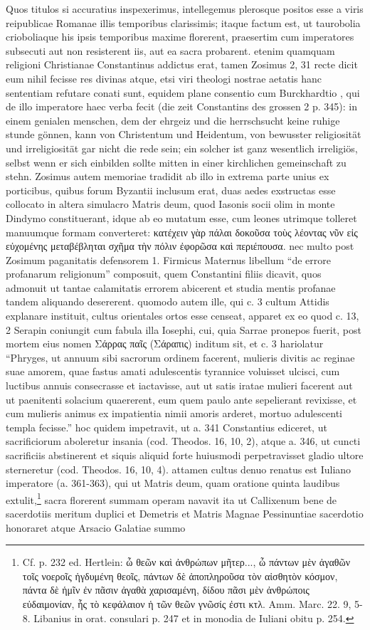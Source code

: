 \documentclass[a4paper, 11pt, oneside, polutonikogreek, german, twocolumn]{article}
\begin{document}
Quos titulos si accuratius inspexerimus, intellegemus plerosque positos esse a viris reipublicae Romanae illis temporibus clarissimis; itaque factum est, ut taurobolia crioboliaque his ipsis temporibus maxime florerent, praesertim cum imperatores subsecuti aut non resisterent iis, aut ea sacra probarent. etenim quamquam religioni Christianae Constantinus addictus erat, tamen Zosimus 2, 31 recte dicit eum nihil fecisse res divinas atque, etsi viri theologi nostrae aetatis hanc sententiam refutare conati sunt, equidem plane consentio cum Burckhardtio , qui de illo imperatore haec verba fecit (die zeit Constantins des grossen 2 p. 345): in einem genialen menschen, dem der ehrgeiz und die herrschsucht keine ruhige stunde gönnen, kann von Christentum und Heidentum, von bewusster religiosität und irreligiosität gar nicht die rede sein; ein solcher ist ganz wesentlich irreligiös, selbst wenn er sich einbilden sollte mitten in einer kirchlichen gemeinschaft zu stehn. Zosimus autem memoriae tradidit ab illo in extrema parte unius ex porticibus, quibus forum Byzantii inclusum erat, duas aedes exstructas esse collocato in altera simulacro Matris deum, quod Iasonis socii olim in monte Dindymo constituerant, idque ab eo mutatum esse, cum leones utrimque tolleret manuumque formam converteret: κατέχειν γὰρ πάλαι δοκοῦσα τοὺς λέοντας νῦν εἰς εὐχομένης μεταβέβληται σχῆμα τὴν πόλιν ἐφορῶσα καὶ περιέπουσα. nec multo post Zosimum paganitatis defensorem 1. Firmicus Maternus libellum "`de errore profanarum religionum"' composuit, quem Constantini filiis dicavit, quos admonuit ut tantae calamitatis errorem abicerent et studia mentis profanae tandem aliquando desererent. quomodo autem ille, qui c. 3 cultum Attidis explanare instituit, cultus orientales ortos esse censeat, apparet ex eo quod c. 13, 2 Serapin coniungit cum fabula illa Iosephi, cui, quia Sarrae pronepos fuerit, post mortem eius nomen Σάρρας παῖς (Σάραπις) inditum sit, et c. 3 hariolatur "`Phryges, ut annuum sibi sacrorum ordinem facerent, mulieris divitis ac reginae suae amorem, quae fastus amati adulescentis tyrannice voluisset ulcisci, cum luctibus annuis consecrasse et iactavisse, aut ut satis iratae mulieri facerent aut ut paenitenti solacium quaererent, eum quem paulo ante sepelierant revixisse, et cum mulieris animus ex impatientia nimii amoris arderet, mortuo adulescenti templa fecisse."' hoc quidem impetravit, ut a. 341 Constantius ediceret, ut sacrificiorum aboleretur insania (cod. Theodos. 16, 10, 2), atque a. 346, ut cuncti sacrificiis abstinerent et siquis aliquid forte huiusmodi perpetravisset gladio ultore sterneretur (cod. Theodos. 16, 10, 4). attamen cultus denuo renatus est Iuliano imperatore (a. 361-363), qui ut Matris deum, quam oratione quinta laudibus extulit,\footnote{Cf. p. 232 ed. Hertlein: ὦ θεῶν καὶ ἀνθρώπων μῆτερ..., ὦ πάντων μὲν ἀγαθῶν τοῖς νοεροῖς ἡγδυμένη θεοῖς, πάντων δὲ ἀποπληροῦσα τὸν αἰσθητὸν κόσμον, πάντα δὲ ἡμῖν ἐν πᾶσιν ἀγαθὰ χαρισαμένη, δίδου πᾶσι μὲν ἀνθρώποις εὐδαιμονίαν, ἧς τὸ κεφάλαιον ἡ τῶν θεῶν γνῶσίς ἐστι κτλ. Amm. Marc. 22. 9, 5-8. Libanius in orat. consulari p. 247 et in monodia de Iuliani obitu p. 254.} sacra florerent summam operam navavit ita ut Callixenum bene de sacerdotiis meritum duplici et Demetris et Matris Magnae Pessinuntiae sacerdotio honoraret atque Arsacio Galatiae summo 
\end{document}
